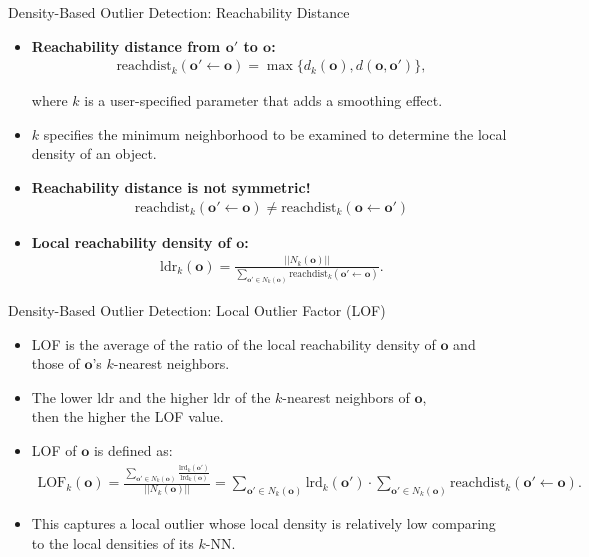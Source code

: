 \begin{frame}{Density-Based Outlier Detection: Reachability Distance}
	\begin{itemize}
		\item \textbf{\color{airforceblue}Reachability distance from $\mathbf{o'}$ to $\mathbf{o}$:}
		      \begin{align*}
			      \text{reachdist}_k(\mathbf{o}' \leftarrow \mathbf{o}) = \max \{d_k(\mathbf{o}), d(\mathbf{o},\mathbf{o}')\},
		      \end{align*}

		      where $k$ is a user-specified parameter that adds a smoothing effect.
		\item $k$ specifies the minimum neighborhood to be examined to determine the local density of an object.
		\item \textbf{Reachability distance is not symmetric!}
		      \begin{align*}
			      \text{reachdist}_k(\mathbf{o}' \leftarrow \mathbf{o}) \neq \text{reachdist}_k(\mathbf{o} \leftarrow \mathbf{o}')
		      \end{align*}
		\item \textbf{Local reachability density of $\mathbf{o}$:}
		      \begin{align*}
			      \text{ldr}_k(\mathbf{o}) = \frac{||N_k(\mathbf{o})||}{\sum_{\mathbf{o'} \in N_k(\mathbf{o})} \text{reachdist}_k(\mathbf{o'} \leftarrow \mathbf{o})}.
		      \end{align*}
	\end{itemize}
\end{frame}


\begin{frame}{Density-Based Outlier Detection: Local Outlier Factor (LOF)}
	\begin{itemize}
		\item LOF is the average of the ratio of the local reachability density of $\mathbf{o}$ and \\
		      those of $\mathbf{o}$'s $k$-nearest neighbors.
		\item The lower $\text{ldr}$ and the higher $\text{ldr}$ of the $k$-nearest neighbors of $\mathbf{o}$,\\
		      then the higher the LOF value.
		\item LOF of $\mathbf{o}$ is defined as:
		      \begin{align*}
			      \text{LOF}_k(\mathbf{o}) = \frac{\sum_{\mathbf{o'} \in N_k(\mathbf{o})} \frac{\text{lrd}_k(\mathbf{o'})}{\text{lrd}_k(\mathbf{o})}}{||N_k(\mathbf{o})||} =
			      \sum_{\mathbf{o'} \in N_k(\mathbf{o})} \text{lrd}_k(\mathbf{o'}) \cdot \sum_{\mathbf{o'} \in N_k(\mathbf{o})} \text{reachdist}_k(\mathbf{o'} \leftarrow \mathbf{o}).
		      \end{align*}
		\item This captures a local outlier whose local density is relatively low comparing to the local densities of its $k$-NN.

	\end{itemize}

\end{frame}

